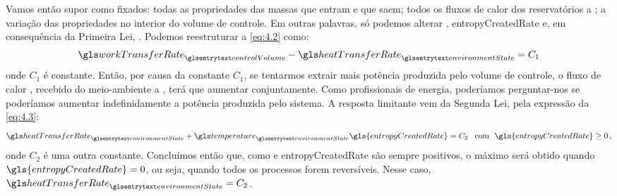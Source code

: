     Vamos então supor como fixados: todas as propriedades das massas que entram
    e que saem; todos os fluxos de calor dos reservatórios a
    ; a variação das propriedades no interior do
    volume de controle. Em outras palavras, só podemos alterar
    , \gls{entropyCreatedRate} e, em
    consequência da Primeira Lei, .
    Podemos reestruturar a \cref{eq:4.2} como:
    \begin{equation} \label{eq:4.5}
        \gsub{workTransferRate}{controlVolume}
        -
        \gsub{heatTransferRate}{environmentState}
        =
        C_1
    \end{equation}
    onde $C_1$ é constante. Então, por causa da constante $C_1$, se tentarmos
    extrair mais potência  produzida pelo
    volume de controle, o fluxo de calor
    , recebido do meio-ambiente a
    , terá que aumentar conjuntamente. Como
    profissionais de energia, poderíamos perguntar-nos se poderíamos aumentar
    indefinidamente a potência produzida pelo sistema. A resposta limitante vem
    da Segunda Lei, pela expressão da \cref{eq:4.3}:
    \begin{equation} \label{eq:4.6}
        \gsub{heatTransferRate}{environmentState}
        +
        \gsub{temperature}{environmentState}
        \gls{entropyCreatedRate}
        =
        C_2\,
        \,\,\,\,
        \text{com}
        \,\,\,\,
        \gls{entropyCreatedRate} \ge 0\,,
    \end{equation}
    onde $C_2$ é uma outra constante. Concluímos então que, como
     e \gls{entropyCreatedRate} são sempre
    positivos, o máximo  será obtido
    quando $\gls{entropyCreatedRate} = 0$, ou seja, quando todos os processos
    forem reversíveis. Nesse caso, $\gsub{heatTransferRate}{environmentState} =
    C_2$.

